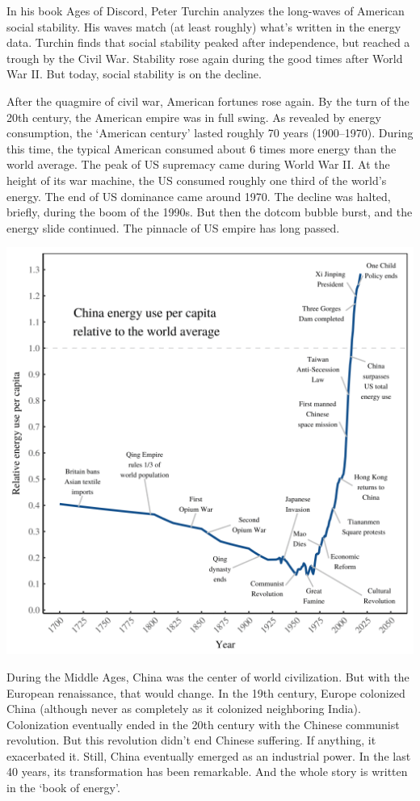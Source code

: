 \documentclass[
]{book}
\begin{document}
In his book Ages of Discord, Peter Turchin analyzes the long-waves of American social stability. His waves match (at least roughly) what's written in the energy data. Turchin finds that social stability peaked after independence, but reached a trough by the Civil War. Stability rose again during the good times after World War II. But today, social stability is on the decline.

After the quagmire of civil war, American fortunes rose again. By the turn of the 20th century, the American empire was in full swing. As revealed by energy consumption, the `American century' lasted roughly 70 years (1900--1970). During this time, the typical American consumed about 6 times more energy than the world average. The peak of US supremacy came during World War II. At the height of its war machine, the US consumed roughly one third of the world's energy.
The end of US dominance came around 1970.
The decline was halted, briefly, during the boom of the 1990s.
But then the dotcom bubble burst, and the energy slide continued.
The pinnacle of US empire has long passed.

\includegraphics{fig/china_energy_pc.png}

During the Middle Ages, China was the center of world civilization. But with the European renaissance, that would change. In the 19th century, Europe colonized China (although never as completely as it colonized neighboring India). Colonization eventually ended in the 20th century with the Chinese communist revolution. But this revolution didn't end Chinese suffering. If anything, it exacerbated it. Still, China eventually emerged as an industrial power. In the last 40 years, its transformation has been remarkable. And the whole story is written in the `book of energy'.
\end{document}
